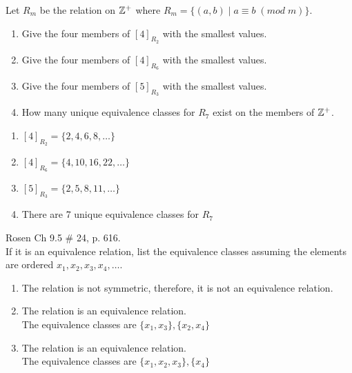 \begin{questions}
    \ifprintanswers
        \vspace{-5pt}
    \fi
{}  Let $R_m$ be the relation on $\mathbb{Z}^+$ where $R_m = \{ (a,b) \;|\; a \equiv b\; ({mod}\; m )\}$.
\begin{enumerate}[label=(\alph*),itemsep=1pt,topsep=1pt]
	\item Give the four members of $[ 4 ]_{R_2}$ with the smallest values.
	\item Give the four members of $[ 4 ]_{R_6}$ with the smallest values.
	\item Give the four members of $[ 5 ]_{R_3}$ with the smallest values.
	\item How many unique equivalence classes for $R_7$ exist on the members of $\mathbb{Z}^+$.
\end{enumerate}
    \ifprintanswers
        \vspace{-12pt}
    \fi
    \begin{solution}
    \begin{enumerate}[label=(\alph*),itemsep=1pt,topsep=0pt]
    	\item $[ 4 ]_{R_2} = \{ 2, 4, 6, 8 ,\ldots \}$
    	\item $[ 4 ]_{R_6} = \{ 4, 10, 16, 22, \ldots \}$
    	\item $[ 5 ]_{R_3} = \{ 2, 5, 8, 11, \ldots \}$

    	\item There are 7 unique equivalence classes for $R_7$ 
    \end{enumerate}
    \end{solution}



	\ifprintanswers
        \vspace{-10pt}
    \fi
{} Rosen Ch 9.5 \# 24, p. 616.  \\
If it is an equivalence relation, list the equivalence classes assuming the elements are ordered $x_1, x_2, x_3, x_4, \dots$. 
	\ifprintanswers
        \vspace{-15pt}
    \fi
    \begin{solution}
    	\begin{enumerate}[label=(\alph*),itemsep=1pt,topsep=0pt]
    		\item The relation is not symmetric, therefore, it is not an equivalence relation. 
    		\item The relation is an equivalence relation. \\
    		The equivalence classes are $\{x_1, x_3\}, \{x_2, x_4\}$
    		\item The relation is an equivalence relation. \\
    		The equivalence classes are $\{ x_1, x_2, x_3 \}, \{ x_4 \}$
    	\end{enumerate}
    \end{solution}




\end{questions}
